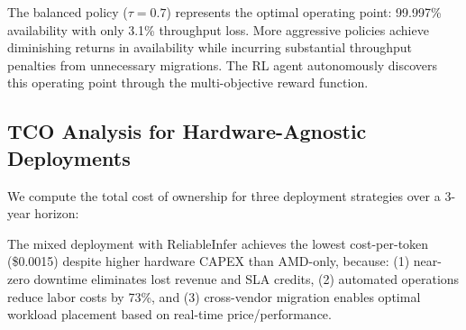 \documentclass[conference,10pt,letterpaper]{IEEEtran}
\begin{document}
The balanced policy ($\tau=0.7$) represents the optimal operating point: 99.997\% availability with only 3.1\% throughput loss. More aggressive policies achieve diminishing returns in availability while incurring substantial throughput penalties from unnecessary migrations. The RL agent autonomously discovers this operating point through the multi-objective reward function.

\subsection{TCO Analysis for Hardware-Agnostic Deployments}

We compute the total cost of ownership for three deployment strategies over a 3-year horizon:

\begin{table}[!t]
\caption{3-Year TCO Comparison (128 Nodes)}
\label{tab:tco}
\centering\scriptsize
{}
\end{table}

The mixed deployment with ReliableInfer achieves the lowest cost-per-token (\$0.0015) despite higher hardware CAPEX than AMD-only, because: (1) near-zero downtime eliminates lost revenue and SLA credits, (2) automated operations reduce labor costs by 73\%, and (3) cross-vendor migration enables optimal workload placement based on real-time price/performance.
\end{document}
